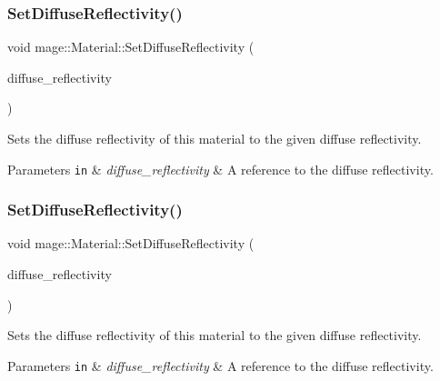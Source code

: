 \subsubsection{\texorpdfstring{Set\+Diffuse\+Reflectivity()}{SetDiffuseReflectivity()}\hspace{0.1cm}{\footnotesize\ttfamily [1/2]}}
{\footnotesize\ttfamily void mage\+::\+Material\+::\+Set\+Diffuse\+Reflectivity (\begin{DoxyParamCaption}\item[{const \hyperlink{structmage_1_1_r_g_b_spectrum}{R\+G\+B\+Spectrum} \&}]{diffuse\+\_\+reflectivity }\end{DoxyParamCaption})\hspace{0.3cm}{\ttfamily [noexcept]}}

Sets the diffuse reflectivity of this material to the given diffuse reflectivity.


\begin{DoxyParams}[1]{Parameters}
\mbox{\tt in}  & {\em diffuse\+\_\+reflectivity} & A reference to the diffuse reflectivity. \\
\hline
\end{DoxyParams}
\hypertarget{structmage_1_1_material_a83281d9408fcdc3c6de6804f31a527b3}{}\label{structmage_1_1_material_a83281d9408fcdc3c6de6804f31a527b3} 
\subsubsection{\texorpdfstring{Set\+Diffuse\+Reflectivity()}{SetDiffuseReflectivity()}\hspace{0.1cm}{\footnotesize\ttfamily [2/2]}}
{\footnotesize\ttfamily void mage\+::\+Material\+::\+Set\+Diffuse\+Reflectivity (\begin{DoxyParamCaption}\item[{\hyperlink{structmage_1_1_r_g_b_spectrum}{R\+G\+B\+Spectrum} \&\&}]{diffuse\+\_\+reflectivity }\end{DoxyParamCaption})\hspace{0.3cm}{\ttfamily [noexcept]}}

Sets the diffuse reflectivity of this material to the given diffuse reflectivity.


\begin{DoxyParams}[1]{Parameters}
\mbox{\tt in}  & {\em diffuse\+\_\+reflectivity} & A reference to the diffuse reflectivity. \\
\hline
\end{DoxyParams}
\hypertarget{structmage_1_1_material_ac5e0b05a30ded7ffb744de4ecbd39e60}{}\label{structmage_1_1_material_ac5e0b05a30ded7ffb744de4ecbd39e60} 
